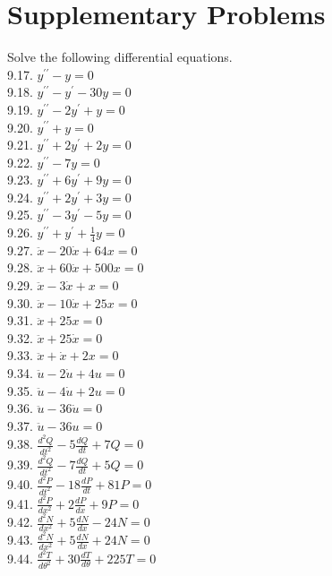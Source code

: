 \documentclass[10pt]{article}
\begin{document}
\section*{Supplementary Problems}
Solve the following differential equations.\\
9.17. $y^{\prime \prime}-y=0$\\
9.18. $y^{\prime \prime}-y^{\prime}-30 y=0$\\
9.19. $y^{\prime \prime}-2 y^{\prime}+y=0$\\
9.20. $y^{\prime \prime}+y=0$\\
9.21. $y^{\prime \prime}+2 y^{\prime}+2 y=0$\\
9.22. $y^{\prime \prime}-7 y=0$\\
9.23. $y^{\prime \prime}+6 y^{\prime}+9 y=0$\\
9.24. $y^{\prime \prime}+2 y^{\prime}+3 y=0$\\
9.25. $y^{\prime \prime}-3 y^{\prime}-5 y=0$\\
9.26. $y^{\prime \prime}+y^{\prime}+\frac{1}{4} y=0$\\
9.27. $\ddot{x}-20 \dot{x}+64 x=0$\\
9.28. $\ddot{x}+60 \dot{x}+500 x=0$\\
9.29. $\ddot{x}-3 \dot{x}+x=0$\\
9.30. $\ddot{x}-10 \dot{x}+25 x=0$\\
9.31. $\ddot{x}+25 x=0$\\
9.32. $\ddot{x}+25 \dot{x}=0$\\
9.33. $\ddot{x}+\dot{x}+2 x=0$\\
9.34. $\ddot{u}-2 \dot{u}+4 u=0$\\
9.35. $\ddot{u}-4 \dot{u}+2 u=0$\\
9.36. $\ddot{u}-36 \dot{u}=0$\\
9.37. $\ddot{u}-36 u=0$\\
9.38. $\frac{d^{2} Q}{d t^{2}}-5 \frac{d Q}{d t}+7 Q=0$\\
9.39. $\frac{d^{2} Q}{d t^{2}}-7 \frac{d Q}{d t}+5 Q=0$\\
9.40. $\frac{d^{2} P}{d t^{2}}-18 \frac{d P}{d t}+81 P=0$\\
9.41. $\frac{d^{2} P}{d x^{2}}+2 \frac{d P}{d x}+9 P=0$\\
9.42. $\frac{d^{2} N}{d x^{2}}+5 \frac{d N}{d x}-24 N=0$\\
9.43. $\frac{d^{2} N}{d x^{2}}+5 \frac{d N}{d x}+24 N=0$\\
9.44. $\frac{d^{2} T}{d \theta^{2}}+30 \frac{d T}{d \theta}+225 T=0$
\end{document}
